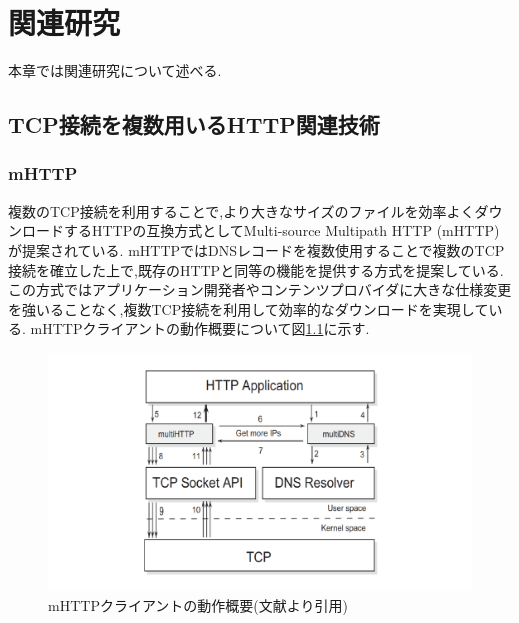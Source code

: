 \documentclass[a4j,12pt]{gradthesis_utf8}
\begin{document}
\chapter{関連研究}\label{sec:sec2}
本章では関連研究について述べる.

\section{TCP接続を複数用いるHTTP関連技術}
\subsection{mHTTP}
複数のTCP接続を利用することで,より大きなサイズのファイルを効率よくダウンロードするHTTPの互換方式としてMulti-source Multipath HTTP (mHTTP)\cite{mhttp}が提案されている.
mHTTPではDNSレコードを複数使用することで複数のTCP接続を確立した上で,既存のHTTPと同等の機能を提供する方式を提案している.この方式ではアプリケーション開発者やコンテンツプロバイダに大きな仕様変更を強いることなく,複数TCP接続を利用して効率的なダウンロードを実現している.
mHTTPクライアントの動作概要について図\ref{mhttp}に示す.

\begin{figure}[h]
	\centering
	\includegraphics[width=14cm]{figure/mhttp.pdf}
	\caption{mHTTPクライアントの動作概要(文献\cite{mhttp}より引用)}
	\label{mhttp}
\end{figure}

\newpage
\end{document}
